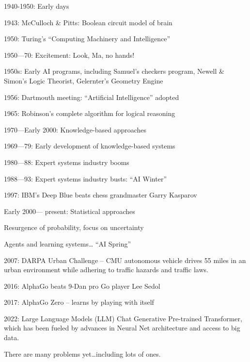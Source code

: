 \begin{listu}
    \item 1940-1950: Early days
    \begin{listu}
        \item 1943: McCulloch \& Pitts: Boolean circuit model of brain
        \item 1950: Turing's “Computing Machinery and Intelligence”
    \end{listu}

    \item 1950—70: Excitement: Look, Ma, no hands!
    \begin{listu}
        \item 1950s: Early AI programs, including Samuel's checkers program, Newell \& Simon's Logic Theorist, Gelernter's Geometry Engine
        \item 1956: Dartmouth meeting: “Artificial Intelligence” adopted
        \item 1965: Robinson's complete algorithm for logical reasoning
    \end{listu}

    \item 1970—Early 2000: Knowledge-based approaches
    \begin{listu}
        \item 1969—79: Early development of knowledge-based systems
        \item 1980—88: Expert systems industry booms
        \item 1988—93: Expert systems industry busts: “AI Winter”
        \item 1997: IBM's Deep Blue beats chess grandmaster Garry Kasparov
    \end{listu}

    \item Early 2000— present: Statistical approaches
    \begin{listu}
        \item Resurgence of probability, focus on uncertainty
        \item Agents and learning systems… “AI Spring”
        \item 2007: DARPA Urban Challenge -- CMU autonomous vehicle drives 55 miles in an urban environment while adhering to traffic hazards and traffic laws.
        \item 2016: AlphaGo beats 9-Dan pro Go player Lee Sedol
        \item 2017: AlphaGo Zero -- learns by playing with itself
        \item 2022: Large Language Models (LLM) Chat Generative Pre-trained Transformer, which has been fueled by advances in Neural Net architecture and access to big data. 
    \end{listu}
\end{listu}

There are many  problems yet\dots including lots of  ones. 